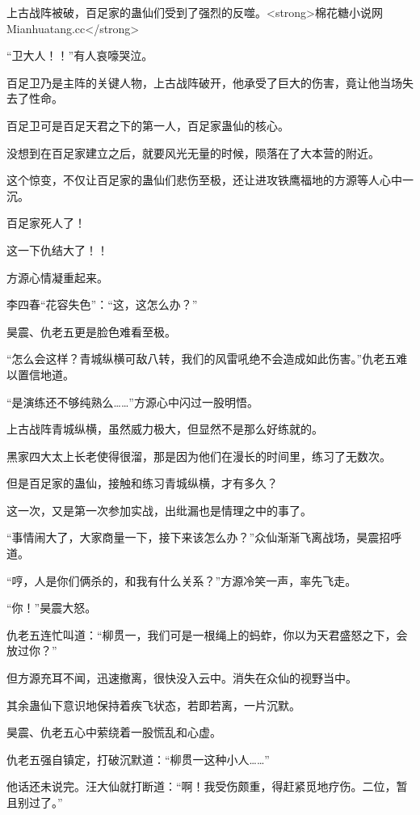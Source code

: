 
\begin{this_body}

上古战阵被破，百足家的蛊仙们受到了强烈的反噬。<strong>棉花糖小说网Mianhuatang.cc</strong>

“卫大人！！”有人哀嚎哭泣。

百足卫乃是主阵的关键人物，上古战阵破开，他承受了巨大的伤害，竟让他当场失去了性命。

百足卫可是百足天君之下的第一人，百足家蛊仙的核心。

没想到在百足家建立之后，就要风光无量的时候，陨落在了大本营的附近。

这个惊变，不仅让百足家的蛊仙们悲伤至极，还让进攻铁鹰福地的方源等人心中一沉。

百足家死人了！

这一下仇结大了！！

方源心情凝重起来。

李四春“花容失色”：“这，这怎么办？”

昊震、仇老五更是脸色难看至极。

“怎么会这样？青城纵横可敌八转，我们的风雷吼绝不会造成如此伤害。”仇老五难以置信地道。

“是演练还不够纯熟么……”方源心中闪过一股明悟。

上古战阵青城纵横，虽然威力极大，但显然不是那么好练就的。

黑家四大太上长老使得很溜，那是因为他们在漫长的时间里，练习了无数次。

但是百足家的蛊仙，接触和练习青城纵横，才有多久？

这一次，又是第一次参加实战，出纰漏也是情理之中的事了。

“事情闹大了，大家商量一下，接下来该怎么办？”众仙渐渐飞离战场，昊震招呼道。

“哼，人是你们俩杀的，和我有什么关系？”方源冷笑一声，率先飞走。

“你！”昊震大怒。

仇老五连忙叫道：“柳贯一，我们可是一根绳上的蚂蚱，你以为天君盛怒之下，会放过你？”

但方源充耳不闻，迅速撤离，很快没入云中。消失在众仙的视野当中。

其余蛊仙下意识地保持着疾飞状态，若即若离，一片沉默。

昊震、仇老五心中萦绕着一股慌乱和心虚。

仇老五强自镇定，打破沉默道：“柳贯一这种小人……”

他话还未说完。汪大仙就打断道：“啊！我受伤颇重，得赶紧觅地疗伤。二位，暂且别过了。”


\end{this_body}
